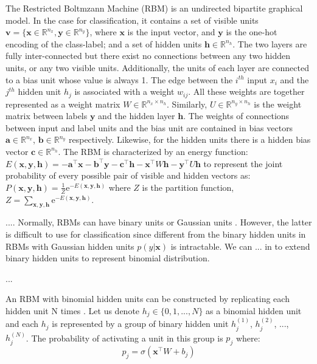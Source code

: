 \documentclass[review]{elsarticle}
\begin{document}
The Restricted Boltmzann Machine (RBM) \cite{Smolensky1986} is an
undirected bipartite graphical model. In the case for classification,
it contains a set of visible units $\mathbf{v}=\{\mathbf{x} \in
\mathbb{R}^{n_x},\mathbf{y} \in \mathbb{R}^{n_y}\}$, where
$\mathbf{x}$ is the input vector, and $\mathbf{y}$ is the one-hot
encoding of the class-label; and a set of hidden units $\mathbf{h} \in
\mathbb{R}^{n_h}$.  The two layers are fully inter-connected but there
exist no connections between any two hidden units, or any two visible
units.  Additionally, the units of each layer are connected to a bias
unit whose value is always 1.  The edge between the $i^{th}$ input
$x_i$ and the $j^{th}$ hidden unit $h_j$ is associated with a weight
$w_{ij}$. All these weights are together represented as a weight
matrix $W \in \mathbb{R}^{n_x \times n_h}$. Similarly, $U \in
\mathbb{R}^{n_y\times n_h}$ is the weight matrix between labels
$\mathbf{y}$ and the hidden layer $\mathbf{h}$.  The weights of
connections between input and label units and the bias unit are
contained in bias vectors $\mathbf{a} \in \mathbb{R}^{n_x}$,
$\mathbf{b} \in \mathbb{R}^{n_y}$ respectively.  Likewise, for the
hidden units there is a hidden bias vector $\mathbf{c} \in
\mathbb{R}^{n_h}$.  The RBM is characterized by an energy function: $
E(\mathbf{x},\mathbf{y}, \mathbf{h}) = -\mathbf{a}^{\top}\mathbf{x}
-\mathbf{b}^{\top}\mathbf{y} - \mathbf{c}^{\top}\mathbf{h} -
\mathbf{x}^{\top}W\mathbf{h} - \mathbf{y}^\top U\mathbf{h}$ to
represent the joint probability of every possible pair of visible and
hidden vectors as: $ P(\mathbf{x},\mathbf{y}, \mathbf{h}) =
\frac{1}{Z} \mathrm{e}^{-E(\mathbf{x},\mathbf{y}, \mathbf{h})}$ where
$Z$ is the partition function, $ Z = \sum_{\mathbf{x},\mathbf{y},
  \mathbf{h}} \mathrm{e}^{-E(\mathbf{x},\mathbf{y}, \mathbf{h})}$.


....  Normally, RBMs can have binary units or Gaussian units
\cite{}. However, the latter is difficult to use for classification
since different from the binary hidden units in RBMs
with Gaussian hidden units $p(y|\mathbf{x})$ is intractable. We can ... in
\cite{} to extend binary hidden units to represent binomial
distribution.

...

An RBM with binomial hidden units can be constructed by replicating
each hidden unit N times \cite{}. Let us denote $h_j \in \{0,1,
...,N\}$ as a binomial hidden unit and each $h_j$ is represented by a
group of binary hidden unit $h_j^{(1)}$, $h_j^{(2)}$, ...,
$h_j^{(N)}$. The probability of activating a unit in this group is
$p_j$ where:
\begin{equation}
 p_j  =  \sigma(\mathbf{x}^\top W + b_j)
\end{equation}
 
\end{document}

